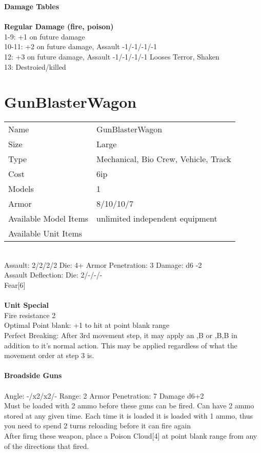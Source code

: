 {\bf Damage Tables} \\
\ \\ {\bf Regular Damage (fire, poison) } \\
1-9: +1 on future damage \\
10-11: +2 on future damage, Assault -1/-1/-1/-1 \\
12: +3 on future damage, Assault -1/-1/-1/-1 Looses Terror, Shaken \\
13: Destroied/killed \\









\pagebreak

\section{ GunBlasterWagon }

\begin{tabular}{ll}
  Name & GunBlasterWagon \\
  Size & Large\\
  Type & Mechanical, Bio Crew, Vehicle, Track\\
  Cost & 6ip\\
  Models & 1\\
  Armor & 8/10/10/7\\
  Available Model Items & unlimited independent equipment \\
  Available Unit Items &  \\
\end{tabular}

\ \\
Assault: 2/2/2/2 Die: 4+ Armor Penetration: 3 Damage: d6 -2 \\
Assault Deflection:  Die: 2/-/-/-\\
\indent Fear[6] \\
\ \\

{\bf Unit Special} \\
Fire resistance 2 \\ Optimal Point blank: +1 to hit at point blank range\\ Perfect Breaking: After 3rd movement step, it may apply an ,B or ,B,B in addition to it's normal action. This may be applied regardless of what the movement order at step 3 is.
\ \\
\ \\
{\bf Broadside Guns } \\
\ \\
Angle: -/x2/x2/- Range: 2 Armor Penetration: 7 Damage d6+2 \\
\indent Must be loaded with 2 ammo before these guns can be fired. Can have 2 ammo stored at any given time. Each time it is loaded it is loaded with 1 ammo, thus you need to spend 2 turns reloading before it can fire again\\ After firng these weapon, place a Poison Cloud[4] at point blank range from any of the directions that fired. \\





